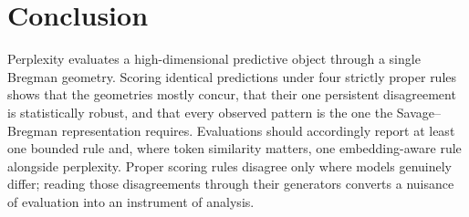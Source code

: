 \documentclass{article}
\begin{document}
\section{Conclusion}

Perplexity evaluates a high-dimensional predictive object through a single Bregman
geometry. Scoring identical predictions under four strictly proper rules shows that the
geometries mostly concur, that their one persistent disagreement is statistically
robust, and that every observed pattern is the one the Savage--Bregman representation
requires. Evaluations should accordingly report at least one bounded rule and, where
token similarity matters, one embedding-aware rule alongside perplexity. Proper scoring
rules disagree only where models genuinely differ; reading those disagreements through
their generators converts a nuisance of evaluation into an instrument of analysis.
\end{document}

